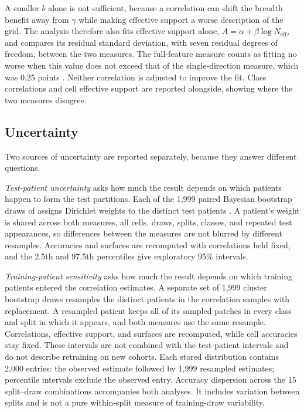 \documentclass[11pt]{article}
\newcommand{\Neff}{N_{\mathrm{eff}}}
\begin{document}
A smaller $b$ alone is not sufficient, because a correlation can shift the breadth benefit away from $\gamma$ while making effective support a worse description of the grid. The analysis therefore also fits effective support alone, $A=\alpha+\beta\log\Neff$, and compares its residual standard deviation, with seven residual degrees of freedom, between the two measures. The full-feature measure counts as fitting no worse when this value does not exceed that of the single-direction measure, which was 0.25 points \citep{queisler2026effectiveSupport}. Neither correlation is adjusted to improve the fit. Class correlations and cell effective support are reported alongside, showing where the two measures disagree.

\subsection{Uncertainty}
\label{sec:uncertainty}
Two sources of uncertainty are reported separately, because they answer different questions.

\emph{Test-patient uncertainty} asks how much the result depends on which patients happen to form the test partitions. Each of the 1,999 paired Bayesian bootstrap draws of \citet{queisler2026effectiveSupport} assigns Dirichlet weights to the distinct test patients \citep{rubin1981bayesian}. A patient's weight is shared across both measures, all cells, draws, splits, classes, and repeated test appearances, so differences between the measures are not blurred by different resamples. Accuracies and surfaces are recomputed with correlations held fixed, and the 2.5th and 97.5th percentiles give exploratory 95\% intervals.

\emph{Training-patient sensitivity} asks how much the result depends on which training patients entered the correlation estimates. A separate set of 1,999 cluster bootstrap draws resamples the distinct patients in the correlation samples with replacement. A resampled patient keeps all of its sampled patches in every class and split in which it appears, and both measures use the same resample. Correlations, effective support, and surfaces are recomputed, while cell accuracies stay fixed. These intervals are not combined with the test-patient intervals and do not describe retraining on new cohorts. Each stored distribution contains 2,000 entries: the observed estimate followed by 1,999 resampled estimates; percentile intervals exclude the observed entry. Accuracy dispersion across the 15 split--draw combinations accompanies both analyses. It includes variation between splits and is not a pure within-split measure of training-draw variability.
\end{document}
